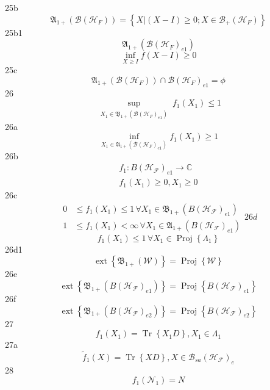 \documentclass[aps,preprint]{revtex4}%
\begin{document}
25b%
\[
\mathfrak{A}_{1+}\left(  \mathcal{B}\left(  \mathcal{H}_{F}\right)  \right)
=\left\{  \left.  X\right\vert \left(  X-I\right)  \geq0;X\in\mathcal{B}%
_{+}\left(  \mathcal{H}_{F}\right)  \right\}
\]
25b1%
\[
\mathfrak{A}_{1+}\left(  \mathcal{B}\left(  \mathcal{H}_{F}\right)
_{e1}\right)
\]%
\[
\inf_{X\geq I}f\left(  X-I\right)  \geq0
\]
25c%
\[
\mathfrak{A}_{1+}\left(  \mathcal{B}\left(  \mathcal{H}_{F}\right)  \right)
\cap\mathcal{B}\left(  \mathcal{H}_{F}\right)  _{e1}=\phi
\]
26%
\[
\sup_{\substack{X_{1}\in\mathfrak{B}_{1+}\left(  \mathcal{B}\left(
\mathcal{H}_{F}\right)  _{e1}\right)  }}f_{1}\left(  X_{1}\right)  \leq1
\]
26a%
\[
\inf_{X_{1}\in\mathfrak{A}_{1+}\left(  \mathcal{B}\left(  \mathcal{H}%
_{F}\right)  _{e1}\right)  }f_{1}\left(  X_{1}\right)  \geq1
\]
26b%
\begin{gather*}
f_{1}:B\left(  \mathcal{H}_{\mathcal{F}}\right)  _{e1}\rightarrow\mathbb{C}\\
f_{1}\left(  X_{1}\right)  \geq0,X_{1}\geq0
\end{gather*}
26c
\begin{subequations}
\label{FORDcon}%
\begin{align*}
0 &  \leq f_{1}\left(  X_{1}\right)  \leq1\,\forall X_{1}\in\mathfrak{B}%
_{1+}\left(  B\left(  \mathcal{H}_{\mathcal{F}}\right)  _{e1}\right)  \\
1 &  \leq f_{1}\left(  X_{1}\right)  <\infty\,\forall X_{1}\in\mathfrak{A}%
_{1+}\left(  B\left(  \mathcal{H}_{\mathcal{F}}\right)  _{e1}\right)
\end{align*}
26d%
\end{subequations}
\[
f_{1}\left(  X_{1}\right)  \leq1\,\forall X_{1}\in\operatorname*{Proj}\left\{
\Lambda_{1}\right\}
\]
26d1%
\[
\operatorname*{ext}\left\{  \mathfrak{B}_{1+}\left(  \mathcal{W}\right)
\right\}  =\operatorname*{Proj}\left\{  \mathcal{W}\right\}
\]
26e%
\[
\operatorname*{ext}\left\{  \mathfrak{B}_{1+}\left(  B\left(  \mathcal{H}%
_{\mathcal{F}}\right)  _{e1}\right)  \right\}  =\operatorname*{Proj}\left\{
B\left(  \mathcal{H}_{\mathcal{F}}\right)  _{e1}\right\}
\]
26f%
\[
\operatorname*{ext}\left\{  \mathfrak{B}_{1+}\left(  B\left(  \mathcal{H}%
_{\mathcal{F}}\right)  _{e2}\right)  \right\}  =\operatorname*{Proj}\left\{
B\left(  \mathcal{H}_{\mathcal{F}}\right)  _{e2}\right\}
\]
27%
\[
f_{1}\left(  X_{1}\right)  =\operatorname*{Tr}\left\{  X_{1}D\right\}
,X_{1}\in\Lambda_{1}%
\]
27a%
\[
\tilde{f}_{1}\left(  X\right)  =\operatorname*{Tr}\left\{  XD\right\}
,X\in\mathcal{B}_{sa}\left(  \mathcal{H}_{\mathcal{F}}\right)  _{e}%
\]
28%
\[
f_{1}\left(  \mathcal{N}_{1}\right)  =N
\]
\end{document}
